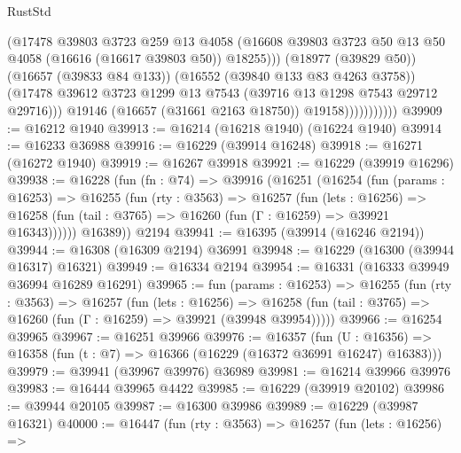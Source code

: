 \begin{lexlean}{RustStd}
\begin{coremodule}
                              (@17478
                                @39803
                                @3723
                                @259
                                @13
                                @4058
                                (@16608
                                  @39803
                                  @3723
                                  @50
                                  @13
                                  @50
                                  @4058
                                  (@16616 (@16617 @39803 @50))
                                  @18255)))
                            (@18977 (@39829 @50))
                            (@16657 (@39833 @84 @133))
                            (@16552 (@39840 @133 @83 @4263 @3758))
                            (@17478
                              @39612
                              @3723
                              @1299
                              @13
                              @7543
                              (@39716 @13 @1298 @7543 @29712 @29716)))
                          @19146
                          (@16657 (@31661 @2163 @18750))
                          @19158)))))))))))
@39909 := @16212 @1940
@39913 := @16214 (@16218 @1940) (@16224 @1940)
@39914 := @16233 @36988
@39916 := @16229 (@39914 @16248)
@39918 := @16271 (@16272 @1940)
@39919 := @16267 @39918
@39921 := @16229 (@39919 @16296)
@39938 := @16228
    (fun (fn : @74) =>
    @39916
      (@16251
        (@16254
          (fun (params : @16253) =>
          @16255
            (fun (rty : @3563) =>
            @16257
              (fun (lets : @16256) =>
              @16258 (fun (tail : @3765) => @16260 (fun (Γ : @16259) => @39921 @16343))))))
        @16389))
    @2194
@39941 := @16395 (@39914 (@16246 @2194))
@39944 := @16308 (@16309 @2194) @36991
@39948 := @16229 (@16300 (@39944 @16317) @16321)
@39949 := @16334 @2194
@39954 := @16331 (@16333 @39949 @36994 @16289 @16291)
@39965 := fun (params : @16253) =>
  @16255
    (fun (rty : @3563) =>
    @16257
      (fun (lets : @16256) =>
      @16258 (fun (tail : @3765) => @16260 (fun (Γ : @16259) => @39921 (@39948 @39954)))))
@39966 := @16254 @39965
@39967 := @16251 @39966
@39976 := @16357
    (fun (U : @16356) => @16358 (fun (t : @7) => @16366 (@16229 (@16372 @36991 @16247) @16383)))
@39979 := @39941 (@39967 @39976) @36989
@39981 := @16214 @39966 @39976
@39983 := @16444 @39965 @4422
@39985 := @16229 (@39919 @20102)
@39986 := @39944 @20105
@39987 := @16300 @39986
@39989 := @16229 (@39987 @16321)
@40000 := @16447
    (fun (rty : @3563) =>
    @16257
      (fun (lets : @16256) =>

\end{coremodule}
\end{lexlean}
